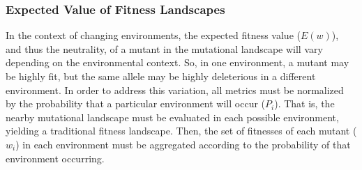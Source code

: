 \documentclass[letterpaper]{article}
\begin{document}


\subsubsection{Expected Value of Fitness Landscapes}
In the context of changing environments, the expected fitness value ($E(w)$), and thus the neutrality, of a mutant in the mutational landscape will vary depending on the environmental context. So, in one environment, a mutant may be highly fit, but the same allele may be highly deleterious in a different environment. In order to address this variation, all metrics must be normalized by the probability that a particular environment will occur ($P_i$). That is, the nearby mutational landscape must be evaluated in each possible environment, yielding a traditional fitness landscape. Then, the set of fitnesses of each mutant ($w_i$) in each environment must be aggregated according to the probability of that environment occurring.
%
%

\end{document}
